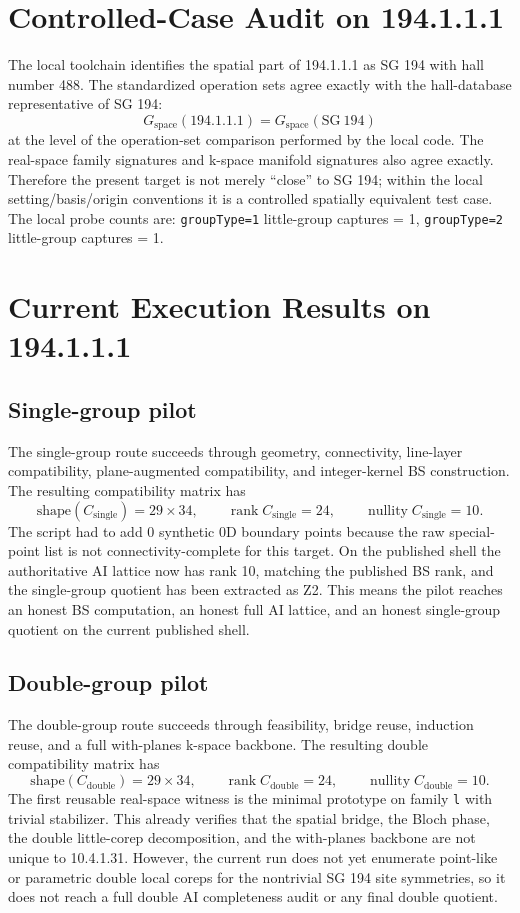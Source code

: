 \documentclass[11pt]{article}
\begin{document}
\section{Controlled-Case Audit on 194.1.1.1}
The local toolchain identifies the spatial part of 194.1.1.1 as SG 194 with hall number 488. The standardized operation sets agree exactly with the hall-database representative of SG 194:
\[
G_{\mathrm{space}}(194.1.1.1) = G_{\mathrm{space}}(\mathrm{SG}\ 194)
\]
at the level of the operation-set comparison performed by the local code. The real-space family signatures and k-space manifold signatures also agree exactly. Therefore the present target is not merely ``close'' to SG 194; within the local setting/basis/origin conventions it is a controlled spatially equivalent test case. The local probe counts are: \texttt{groupType=1} little-group captures = 1, \texttt{groupType=2} little-group captures = 1.

\section{Current Execution Results on 194.1.1.1}
\subsection*{Single-group pilot}
The single-group route succeeds through geometry, connectivity, line-layer compatibility, plane-augmented compatibility, and integer-kernel BS construction. The resulting compatibility matrix has
\[
\mathrm{shape}(C_{\mathrm{single}}) = 29 \times 34, \qquad
\operatorname{rank} C_{\mathrm{single}} = 24, \qquad
\operatorname{nullity} C_{\mathrm{single}} = 10.
\]
The script had to add 0 synthetic 0D boundary points because the raw special-point list is not connectivity-complete for this target. On the published shell the authoritative AI lattice now has rank 10, matching the published BS rank, and the single-group quotient has been extracted as Z2. This means the pilot reaches an honest BS computation, an honest full AI lattice, and an honest single-group quotient on the current published shell.

\subsection*{Double-group pilot}
The double-group route succeeds through feasibility, bridge reuse, induction reuse, and a full with-planes k-space backbone. The resulting double compatibility matrix has
\[
\mathrm{shape}(C_{\mathrm{double}}) = 29 \times 34, \qquad
\operatorname{rank} C_{\mathrm{double}} = 24, \qquad
\operatorname{nullity} C_{\mathrm{double}} = 10.
\]
The first reusable real-space witness is the minimal prototype on family \texttt{l} with trivial stabilizer. This already verifies that the spatial bridge, the Bloch phase, the double little-corep decomposition, and the with-planes backbone are not unique to 10.4.1.31. However, the current run does not yet enumerate point-like or parametric double local coreps for the nontrivial SG 194 site symmetries, so it does not reach a full double AI completeness audit or any final double quotient.
\end{document}

